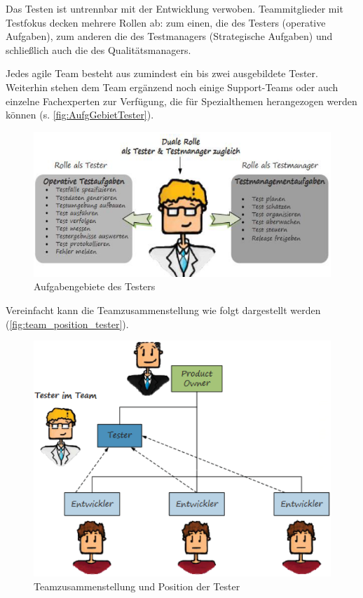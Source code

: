 Das Testen ist untrennbar mit der Entwicklung verwoben. Teammitglieder mit Testfokus decken mehrere Rollen ab: zum einen, die des Testers (operative Aufgaben), zum anderen die des Testmanagers (Strategische Aufgaben) und schließlich auch die des Qualitätsmanagers.

Jedes agile Team besteht aus zumindest ein bis zwei ausgebildete Tester. Weiterhin stehen dem Team ergänzend noch einige Support-Teams oder auch einzelne Fachexperten zur Verfügung, die für Spezialthemen herangezogen werden können (s. \autoref{fig:AufgGebietTester}).

\begin{figure}[!htb]
    \centering
    \includegraphics[width=.9\textwidth]{figures/rebecca/Aufgaben_Tester.png}
    \caption[]{Aufgabengebiete des Testers}
    \label{fig:AufgGebietTester}
\end{figure}

Vereinfacht kann die Teamzusammenstellung wie folgt dargestellt werden (\autoref{fig:team_position_tester}).

\begin{figure}[!htb]
    \centering
    \includegraphics[width=.9\textwidth]{figures/rebecca/Position_Tester.png}
    \caption[]{Teamzusammenstellung und Position der Tester}
    \label{fig:team_position_tester}
\end{figure}

